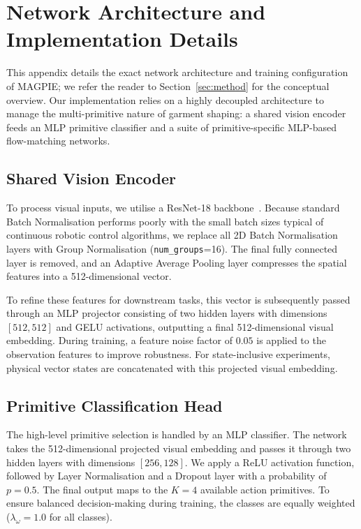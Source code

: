 \documentclass[journal]{IEEEtran}
\begin{document}



\newpage

\appendices

\section{Network Architecture and Implementation Details}
\label{app:architecture}

This appendix details the exact network architecture and training configuration of MAGPIE; we refer the reader to Section~\ref{sec:method} for the conceptual overview. Our implementation relies on a highly decoupled architecture to manage the multi-primitive nature of garment shaping: a shared vision encoder feeds an MLP primitive classifier and a suite of primitive-specific MLP-based flow-matching networks.

\subsection{Shared Vision Encoder}
To process visual inputs, we utilise a ResNet-18 backbone~\cite{he2016deep}. Because standard Batch Normalisation performs poorly with the small batch sizes typical of continuous robotic control algorithms, we replace all 2D Batch Normalisation layers with Group Normalisation (\texttt{num\_groups}=16). The final fully connected layer is removed, and an Adaptive Average Pooling layer compresses the spatial features into a 512-dimensional vector.

To refine these features for downstream tasks, this vector is subsequently passed through an MLP projector consisting of two hidden layers with dimensions $[512, 512]$ and GELU activations, outputting a final 512-dimensional visual embedding. During training, a feature noise factor of $0.05$ is applied to the observation features to improve robustness. For state-inclusive experiments, physical vector states are concatenated with this projected visual embedding.

\subsection{Primitive Classification Head}
The high-level primitive selection is handled by an MLP classifier. The network takes the 512-dimensional projected visual embedding and passes it through two hidden layers with dimensions $[256, 128]$. We apply a ReLU activation function, followed by Layer Normalisation and a Dropout layer with a probability of $p = 0.5$. The final output maps to the $K=4$ available action primitives. To ensure balanced decision-making during training, the classes are equally weighted ($\lambda_\omega = 1.0$ for all classes).
\end{document}
